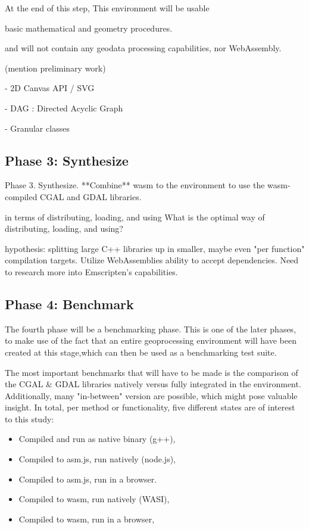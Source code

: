 At the end of this step, This environment will be usable 

basic mathematical and geometry procedures. 

and will not contain any geodata processing capabilities, nor WebAssembly. 





(mention preliminary work)

- 2D Canvas API / SVG 

- DAG : Directed Acyclic Graph

- Granular classes



\subsection{Phase 3: Synthesize}

Phase 3. Synthesize. **Combine** wasm to the environment to use the wasm-compiled CGAL and GDAL libraries.

in terms of distributing, loading, and using 
What is the optimal way of distributing, loading, and using?

hypothesis: splitting large C++ libraries up in smaller, maybe even "per function" compilation targets. 
Utilize WebAssemblies ability to accept dependencies.
Need to research more into Emscripten's capabilities.

\subsection{Phase 4: Benchmark}

The fourth phase will be a benchmarking phase. This is one of the later phases, to make use of the fact that an entire geoprocessing environment will have been created at this stage,which can then be used as a benchmarking test suite. 

The most important benchmarks that will have to be made is the comparison of the CGAL \& GDAL libraries natively versus fully integrated in the environment. Additionally, many "in-between" version are possible, which might pose valuable insight. In total, per method or functionality, five different states are of interest to this study:

\begin{itemize}
    \item Compiled and run as native binary (g++),
    \item Compiled to asm.js, run natively (node.js),
    \item Compiled to asm.js, run in a browser.
    \item Compiled to wasm, run natively (WASI),
    \item Compiled to wasm, run in a browser,
\end{itemize}



